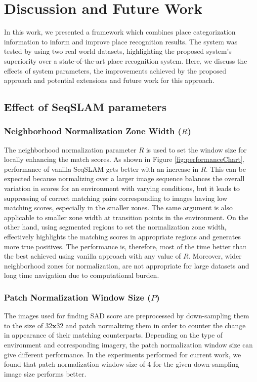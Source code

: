 \documentclass[letterpaper, 10 pt, conference]{ieeeconf}  %
\begin{document}
\section{Discussion and Future Work}
In this work, we presented a framework which combines place categorization information to inform and improve place recognition results. The system was tested by using two real world datasets, highlighting the proposed system's superiority over a state-of-the-art place recognition system. Here, we discuss the effects of system parameters, the improvements achieved by the proposed approach and potential extensions and future work for this approach. 

\subsection{Effect of SeqSLAM parameters}
\subsubsection{Neighborhood Normalization Zone Width ($R$)}
The neighborhood normalization parameter $R$ is used to set the window size for locally enhancing the match scores. As shown in Figure \ref{fig:performanceChart}, performance of vanilla SeqSLAM gets better with an increase in $R$. This can be expected because normalizing over a larger image sequence balances the overall variation in scores for an environment with varying conditions, but it leads to suppressing of correct matching pairs corresponding to images having low matching scores, especially in the smaller zones. The same argument is also applicable to smaller zone width at transition points in the environment. On the other hand, using segmented regions to set the normalization zone width, effectively highlights the matching scores in appropriate regions and generates more true positives. The performance is, therefore, most of the time better than the best achieved using vanilla approach with any value of $R$. Moreover, wider neighborhood zones for normalization, are not appropriate for large datasets and long time navigation due to computational burden. 

\subsubsection{Patch Normalization Window Size ($P$)}
The images used for finding SAD score are preprocessed by down-sampling them to the size of $32\mathbf{x}32$ and patch normalizing them in order to counter the change in appearance of their matching counterparts. Depending on the type of environment and corresponding imagery, the patch normalization window size can give different performance. In the experiments performed for current work, we found that patch normalization window size of 4 for the given down-sampling image size performs better.
\end{document}
